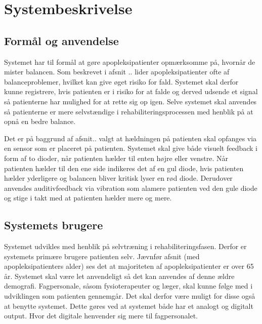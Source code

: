 \section{Systembeskrivelse}  

\subsection{Formål og anvendelse}
Systemet har til formål at gøre apopleksipatienter opmærksomme på, hvornår de mister balancen. Som beskrevet i afsnit .. lider apopleksipatienter ofte af balanceproblemer, hvilket kan give øget risiko for fald. Systemet skal derfor kunne registrere, hvis patienten er i risiko for at falde og derved udsende et signal så patienterne har mulighed for at rette sig op igen. Selve systemet skal anvendes så patienterne er mere selvstændige i rehabiliteringsprocessen med henblik på at opnå en bedre balance. 

Det er på baggrund af afsnit.. valgt at hældningen på patienten skal opfanges via en sensor som er placeret på patienten. Systemet skal give både visuelt feedback i form af to dioder, når patienten hælder til enten højre eller venstre. Når patienten hælder til den ene side indikeres det af en gul diode, hvis patienten hælder yderligere og balancen bliver kritisk lyser en rød diode. Derudover anvendes auditivfeedback via vibration som alamere patienten ved den gule diode og stige i takt med at patienten hælder mere og mere.  


\subsection{Systemets brugere}
Systemet udvikles med henblik på selvtræning i rehabiliteringsfasen. Derfor er systemets primære brugere patienten selv. Jævnfør afsnit (med apopleksipatienters alder) ses det at majoriteten af apopleksipatienter er over 65 år. Systemet skal være let anvendeligt så det kan anvendes af denne ældre demografi. Fagpersonale, såsom fysioterapeuter og læger, skal kunne følge med i udviklingen som patienten gennemgår. Det skal derfor være muligt for disse også at benytte systemet. Dette gøres ved at systemet både har et analogt og digitalt output. Hvor det digitale henvender sig mere til fagpersonalet.

